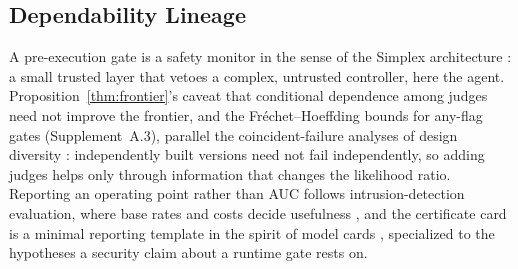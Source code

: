\subsection{Dependability Lineage}
A pre-execution gate is a safety monitor in the sense of the Simplex architecture
\citep{sha2001simplex}: a small trusted layer that vetoes a complex, untrusted controller, here
the agent. Proposition~\ref{thm:frontier}'s caveat that conditional dependence among judges need
not improve the frontier, and the Fr\'echet--Hoeffding bounds for any-flag gates
(Supplement~A.3), parallel the coincident-failure analyses of design diversity
\citep{eckhardt1985theoretical}: independently built versions need not fail independently, so
adding judges helps only through information that changes the likelihood ratio. Reporting an
operating point rather than AUC follows intrusion-detection evaluation, where base rates and
costs decide usefulness \citep{axelsson2000base}, and the certificate card is a minimal
reporting template in the spirit of model cards \citep{mitchell2019model}, specialized to the
hypotheses a security claim about a runtime gate rests on.
